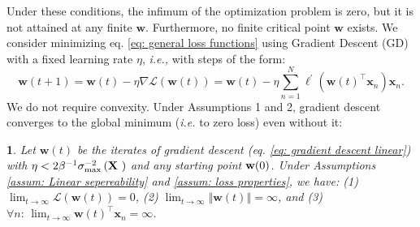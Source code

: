 \documentclass[twoside,11pt,english]{article}
\newtheorem{lem}[thm]{\protect\lemmaname}
\providecommand{\lemmaname}{Lemma}
\providecommand{\lemmaname}{Lemma}
\begin{document}
Under these conditions, the infimum of the optimization problem is
zero, but it is not attained at any finite $\mathbf{w}$. Furthermore,
no finite critical point $\mathbf{w}$ exists. We consider minimizing
eq. \ref{eq: general loss functions} using Gradient Descent (GD)
with a fixed learning rate $\eta$, \emph{i.e., }with steps of the
form: 
\begin{equation}
\mathbf{w}\left(t+1\right)=\mathbf{w}\left(t\right)-\eta\nabla\mathcal{L}\left(\mathbf{w}(t)\right)=\mathbf{w}\left(t\right)-\eta\sum_{n=1}^{N}\ell^{\prime}\left(\mathbf{w}\left(t\right)^{\top}\mathbf{x}_{n}\right)\mathbf{x}_{n}.\label{eq: gradient descent linear}
\end{equation}
We do not require convexity. Under Assumptions 1 and 2, gradient descent
converges to the global minimum (\emph{i.e.} to zero loss) even without
it: 
\begin{lem}
\label{lem: convergence of linear classifiers}Let $\mathbf{w}\left(t\right)$
be the iterates of gradient descent (eq. \ref{eq: gradient descent linear})
with $\eta<2\beta^{-1}\sigma_{\max}^{-2}\left(\text{\ensuremath{\mathbf{X}} }\right)$
and any starting point $\mathbf{w}(0)$. Under Assumptions \ref{assum: Linear sepereability}
and \ref{assum: loss properties}, we have: (1) $\lim_{t\rightarrow\infty}\mathcal{L}\left(\mathbf{w}\left(t\right)\right)=0$,
(2) $\lim_{t\rightarrow\infty}\left\Vert \mathbf{w}\left(t\right)\right\Vert =\infty$,
and (3) $\forall n:\,\lim_{t\rightarrow\infty}\mathbf{w}\left(t\right)^{\top}\mathbf{x}_{n}=\infty$. 
\end{lem}
\end{document}
